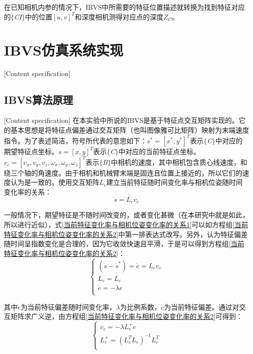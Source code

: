\documentclass[fontset=fandol,type=bachelor,campus=harbin]{hithesisbook}
\begin{document}
在已知相机内参的情况下，IBVS中所需要的特征位置描述就转换为找到特征对应的$\lbrace$\textit{CI}$\rbrace$中的位置$\left[ u,v \right] ^T$和深度相机测得对应点的深度$Z_C$。

\section{IBVS仿真系统实现}[Content specification]
\subsection{IBVS算法原理}[Content specification]
在本实验中所说的IBVS是基于特征点交互矩阵实现的\cite{chaumette2006visual}。它的基本思想是将特征点偏差通过交互矩阵（也叫图像雅可比矩阵）映射为末端速度指令。为了表述简洁，符号所代表的意思如下：$s^*=\left[ x^*,y^* \right] ^T$表示$\lbrace$\textit{C}$\rbrace$中对应的期望特征点坐标。$s=\left[ x,y \right] ^T$表示$\lbrace$\textit{C}$\rbrace$中对应的当前特征点坐标。$v_c=\left[ v_x,v_y,v_z,\omega _x,\omega _y,\omega _z \right] ^T$表示$\lbrace$\textit{B}$\rbrace$中相机的速度，其中相机包含质心线速度，和绕三个轴的角速度。由于相机和机械臂末端是固连且位置上接近的，所以它们的速度认为是一致的。使用交互矩阵$L_c$建立当前特征随时间变化率与相机位姿随时间变化率的关系：
\begin{equation}
\dot{s}=L_cv_c 
\label{当前特征变化率与相机位姿变化率的关系1} 
\end{equation} 


一般情况下，期望特征是不随时间改变的，或者变化甚微（在本研究中就是如此，所以进行近似），式\ref{当前特征变化率与相机位姿变化率的关系1}可以如方程组\ref{当前特征变化率与相机位姿变化率的关系2}中第一排表达式改写。另外，认为特征偏差随时间呈指数变化是合理的，因为它收敛快速且平滑\cite{chaumette2006visual}，于是可以得到方程组\ref{当前特征变化率与相机位姿变化率的关系2}：
\begin{equation}
\left\{ \begin{array}{c}
	\left( \dot{s}-\dot{s}^* \right) =\dot{e}=L_cv_c\\
	L_e=L_c\\
	\dot{e}=-\lambda e\\
\end{array} \right.  
\label{当前特征变化率与相机位姿变化率的关系2} 
\end{equation} 


其中$\dot{e}$为当前特征偏差随时间变化率，$\lambda$为比例系数，$\dot{e}$为当前特征偏差。通过对交互矩阵求广义逆，由方程组\ref{当前特征变化率与相机位姿变化率的关系2}可得到：
\begin{equation}
\left\{ \begin{array}{c}
	v_c=-\lambda L_{e}^{+}e\\
	L_{e}^{+}=\left( L_{e}^{T}L_e \right) ^{-1}L_{e}^{T}\\
\end{array} \right. 
\label{当前特征变化率与相机位姿变化率的关系3} 
\end{equation} 
\end{document}
